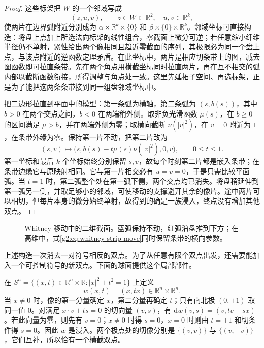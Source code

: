 \begin{proof}
	这些标架把 \(W\) 的一个邻域写成
	\[
		(z,u,v),\qquad z\in W\subset\mathbb R^2,\quad u,v\in\mathbb R^k,
	\]
	使两片在边界弧附近分别成为 \(\alpha\times\mathbb R^k\times\{0\}\) 和 \(\beta\times\{0\}\times\mathbb R^k\)。邻域坐标可直接构造：将盘上点加上所选法向标架的线性组合，零截面上微分可逆；若任意缩小纤维半径仍不单射，紧性给出两个像相同且趋近零截面的序列，其极限必为同一个盘上点，与该点附近的逆函数定理矛盾。在此坐标中，两片是相应切条带上的图，减去图函数即可拉直条带。先在两个角点用横截坐标同时拉直两片，再在互不相交的弧内部以截断函数衔接，所得调整与角点处一致。这里先延拓子空间、再选标架，正是为了能把这两条条带接到同一组盘邻域坐标中。

	把二边形拉直到平面中的模型：第一条弧为横轴，第二条弧为 \((s,b(s))\)，其中 \(b>0\) 在两个交点之间，\(b<0\) 在两端稍外侧。取非负光滑函数 \(\mu(s)\)，在 \(b\ge0\) 的区间满足 \(\mu>b\)，并在两端外侧为零；取横向截断 \(\nu(|v|^2)\)，在 \(v=0\) 附近为 \(1\)，在条带外缘为零。保持第一片不动，把第二片改为
	\begin{equation}\label{g2:eq:whitney-strip-move}
		(s,v)\longmapsto\bigl(s,b(s)-t\mu(s)\nu(|v|^2),0,v\bigr),\qquad 0\le t\le1.
	\end{equation}
	第一坐标和最后 \(k\) 个坐标始终分别保留 \(s,v\)，故每个时刻第二片都是嵌入条带；在条带边缘它与原映射相同。它与第一片相交必有 \(u=v=0\)，于是只需比较平面弧。当 \(t=1\) 时，第二弧整个处在第一弧下侧，两个交点均已消失。将盘稍延伸到第一弧另一侧，并取足够小的邻域，可使移动的支撑避开其余的像片。途中两片可以相切，但每片本身的微分始终单射，故得到的确是一族浸入，终点没有增加其他双点。
\end{proof}

\begin{figure}[htbp]
	\centering
	
	\caption{Whitney 移动中的二维截面。蓝弧保持不动，红弧沿盘推到下方；在高维中，式\eqref{g2:eq:whitney-strip-move}同时保留条带的横向参数。}
	\label{g2:fig:whitney-move}
\end{figure}

上述构造一次消去一对符号相反的双点。为了从任意有限个双点出发，还需要能加入一个可控制符号的新双点。下面的球面提供这个局部部件。

\begin{example}[Whitney 球]\label{g2:exm:whitney-sphere}
	在 \(S^n=\{(x,t)\in\mathbb R^n\times\mathbb R:|x|^2+t^2=1\}\) 上定义
	\[
		w(x,t)=(x,tx)\in\mathbb R^n\times\mathbb R^n.
	\]
	当 \(x\ne0\) 时，像的第一分量确定 \(x\)，第二分量再确定 \(t\)；只有南北极 \((0,\pm1)\) 取同一值 \(0\)。对满足 \(x\cdot v+ts=0\) 的切向量 \((v,s)\)，有 \(\mathrm{d}w(v,s)=(v,tv+sx)\)。若此向量为零，则先有 \(v=0\)；\(x\ne0\) 时得 \(s=0\)，\(x=0\) 时则由 \(t=\pm1\) 和切条件得 \(s=0\)。因此 \(w\) 是浸入。两个极点处的切像分别是 \(\{(v,v)\}\) 与 \(\{(v,-v)\}\)，它们互补，所以恰有一个横截双点。
\end{example}

